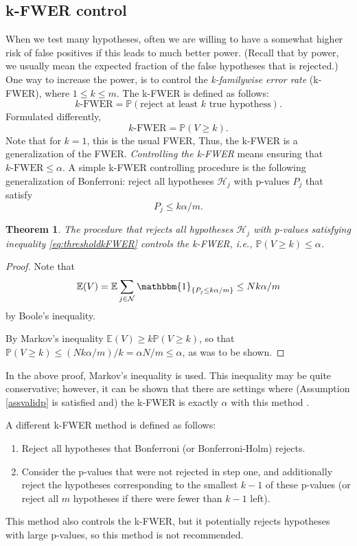 \documentclass[11pt]{article}
\theoremstyle{plain}
\newtheorem{theorem}{Theorem}[section]
\theoremstyle{definition}
\newcommand{\N}{\mathcal{N}}
\newcommand{\Hy}{\mathcal{H}}
\newcommand{\pr}{\mathbb{P}}
\newcommand{\citp}{\citep}
\begin{document}
\subsection{k-FWER control} \label{seckFWER}
When we test many hypotheses, often we are willing to have a somewhat higher risk of false positives if this leads to much better power. (Recall that by power, we usually mean the expected fraction of the false hypotheses that is rejected.) One way to increase the power, is to control the \emph{k-familywise error rate} (k-FWER), where $1\leq k\leq m$. The k-FWER is defined as follows:
$$k\text{-FWER}=\pr(\text{reject at least } k \text{ true hypothess}).$$
Formulated differently, 
$$k\text{-FWER}=\pr(V\geq k).$$
Note that for $k=1$, this is the usual FWER, Thus, the k-FWER is a generalization of the FWER.
\emph{Controlling the k-FWER} means ensuring that
$ k\text{-FWER}\leq \alpha.$
A simple k-FWER controlling procedure is the following generalization of Bonferroni:  reject all hypotheses $\Hy_j$ with p-values $P_j$ that satisfy
\begin{equation}\label{eq:thresholdkFWER}
P_j\leq k\alpha/m.
\end{equation}

\begin{theorem} \label{thmkFWERss}
The procedure that rejects all hypotheses $\Hy_j$ with p-values satisfying inequality \eqref{eq:thresholdkFWER} controls the k-FWER, i.e., $\pr(V\geq k)\leq\alpha$.
\end{theorem}

\begin{proof}
Note that $$\mathbb{E}(V) =\mathbb{E}\sum_{j\in \N}\mathbbm{1}_{\{P_j\leq k\alpha/m\}} \leq N k\alpha/m$$
by Boole's inequality.

By Markov's inequality
$\mathbb{E}(V)\geq k\pr(V\geq k) $, so that 
$\pr(V\geq k) \leq (N k\alpha/m)/k = \alpha N/m\leq \alpha$, as was to be shown.
\end{proof}
In the above proof, Markov's inequality is used. This inequality may be  quite conservative; however, it can be shown that there are settings where (Assumption \ref{assvalidp} is satisfied and) the k-FWER is exactly $\alpha$ with this method \citp[][Thm 2.1(ii)]{lehmann2005generalizations}.

A different k-FWER method is defined as follows:
\begin{enumerate}
\item Reject all hypotheses that Bonferroni (or Bonferroni-Holm) rejects.
\item Consider the p-values that were not rejected in step one, and additionally reject the hypotheses corresponding to the smallest $k-1$ of these p-values (or reject all $m$ hypotheses if there were fewer than $k-1$ left).
\end{enumerate}
This method also controls the k-FWER, but it potentially rejects hypotheses with large p-values, so this method is not recommended.
\end{document}

